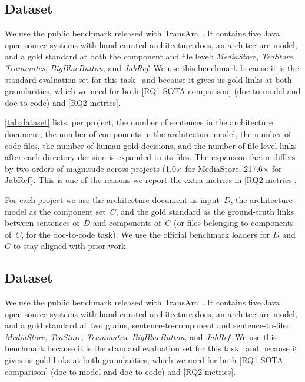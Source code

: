 \subsection{Dataset} \label{sec:dataset}

We use the public benchmark released with TransArc~\cite{transarc,replication}.
It contains five Java open-source systems with hand-curated architecture docs,
an architecture model, and a gold standard at both the component and file level:
\emph{MediaStore}, \emph{TeaStore}, \emph{Teammates}, \emph{BigBlueButton}, and
\emph{JabRef}. We use this benchmark because it is the standard evaluation set
for this task~\cite{transarc,lissa} and because it gives us gold links at both
granularities, which we need for both \ref{RQ1 SOTA comparison} (doc-to-model
and doc-to-code) and \ref{RQ2 metrics}.



\autoref{tab:dataset} lists, per project, the number of sentences in the
architecture document, the number of components in the architecture model, the
number of code files, the number of human gold decisions, and the number of
file-level links after each directory decision is expanded to its files. The
expansion factor differs by two orders of magnitude across projects (1.0$\times$
for MediaStore, 217.6$\times$ for JabRef). This is one of the reasons we report
the extra metrics in \ref{RQ2 metrics}.

For each project we use the architecture document as input~$D$, the
architecture model as the component set~$C$, and the gold standard as the
ground-truth links between sentences of~$D$ and components of~$C$ (or files
belonging to components of~$C$, for the doc-to-code task). We use the official
benchmark loaders for $D$ and $C$ to stay aligned with prior work.

\subsection{Dataset}
\label{sec:dataset}

We use the public benchmark released with TransArc~\cite{transarc,replication}.
It contains five Java open-source systems with hand-curated architecture docs, an architecture model, and a gold standard at two grains, sentence-to-component and sentence-to-file:
\emph{MediaStore}, \emph{TeaStore}, \emph{Teammates}, \emph{BigBlueButton}, and \emph{JabRef}.
We use this benchmark because it is the standard evaluation set for this task~\cite{transarc,lissa} and because it gives us gold links at both granularities, which we need for both \ref{RQ1 SOTA comparison} (doc-to-model and doc-to-code) and \ref{RQ2 metrics}.


